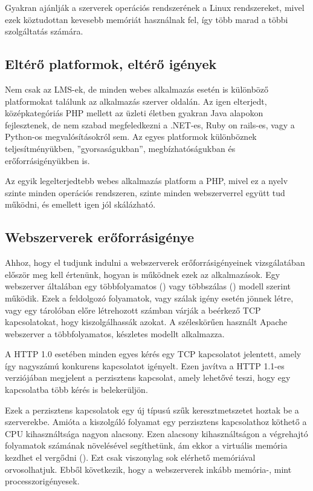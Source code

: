 Gyakran ajánlják a szerverek operációs rendszerének a Linux rendszereket, mivel ezek köztudottan kevesebb memóriát használnak fel, így több marad a többi szolgáltatás számára. 

\subsection{Eltérő platformok, eltérő igények}
Nem csak az LMS-ek, de minden webes alkalmazás esetén is különböző platformokat találunk az alkalmazás szerver oldalán. Az igen elterjedt, középkategóriás PHP mellett az üzleti életben gyakran Java alapokon fejlesztenek, de nem szabad megfeledkezni a .NET-es, Ruby on rails-es, vagy a Python-os megvalósításokról sem. Az egyes platformok különböznek teljesítményükben, ''gyorsaságukban'', megbízhatóságukban és erőforrásigényükben is.

Az egyik legelterjedtebb webes alkalmazás platform a PHP, mivel ez a nyelv szinte minden operációs rendszeren, szinte minden webszerverrel együtt tud működni, és emellett igen jól skálázható.

\subsection{Webszerverek erőforrásigénye}

Ahhoz, hogy el tudjunk indulni a webszerverek erőforrásigényeinek vizsgálatában először meg kell értenünk, hogyan is működnek ezek az alkalmazások. Egy webszerver általában egy többfolyamatos () vagy többszálas () modell szerint működik.\cite{Lu:2001:FCA:882481.883781} Ezek a feldolgozó folyamatok, vagy szálak igény esetén jönnek létre, vagy egy tárolóban előre létrehozott számban várják a beérkező TCP kapcsolatokat, hogy kiszolgálhassák azokat. A széleskörűen használt Apache webszerver a többfolyamatos, készletes modellt alkalmazza.

A HTTP 1.0 esetében minden egyes kérés egy TCP kapcsolatot jelentett, amely így nagyszámú konkurens kapcsolatot igényelt. Ezen javítva a HTTP 1.1-es verziójában megjelent a perzisztens kapcsolat, amely lehetővé teszi, hogy egy kapcsolatba több kérés is belekerüljön.

Ezek a perzisztens kapcsolatok egy új típusú szűk keresztmetszetet hoztak be a szerverekbe. Amióta a kiszolgáló folyamat egy perzisztens kapcsolathoz köthető a CPU kihasználtsága nagyon alacsony. Ezen alacsony kihasználtságon a végrehajtó folyamatok számának növelésével segíthetünk, ám ekkor a virtuális memória kezdhet el vergődni (). Ezt csak viszonylag sok elérhető memóriával orvosolhatjuk. Ebből következik, hogy a webszerverek inkább memória-, mint processzorigényesek. 

